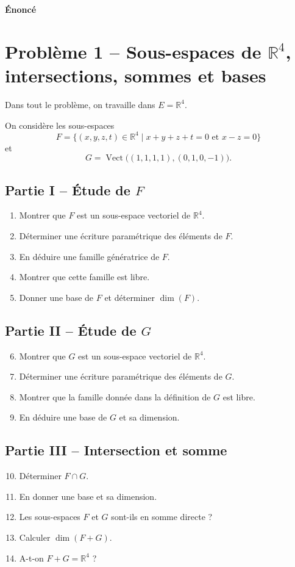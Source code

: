 \documentclass[11pt,a4paper]{article}
\newcommand{\R}{\mathbb{R}}
\newcommand{\Vect}{\operatorname{Vect}}
\newcommand{\dimv}{\operatorname{dim}}
\begin{document}
\vspace{0.6em}

\begin{center}
\textbf{Énoncé}
\end{center}

\section*{Problème 1 -- Sous-espaces de $\R^4$, intersections, sommes et bases}

Dans tout le problème, on travaille dans $E=\R^4$.

On considère les sous-espaces
\[
F=\{(x,y,z,t)\in\R^4\mid x+y+z+t=0\text{ et }x-z=0\}
\]
et
\[
G=\Vect\bigl((1,1,1,1),(0,1,0,-1)\bigr).
\]

\subsection*{Partie I -- Étude de $F$}
\begin{enumerate}[label=\arabic*.]
    \item Montrer que $F$ est un sous-espace vectoriel de $\R^4$.
    \item Déterminer une écriture paramétrique des éléments de $F$.
    \item En déduire une famille génératrice de $F$.
    \item Montrer que cette famille est libre.
    \item Donner une base de $F$ et déterminer $\dimv(F)$.
\end{enumerate}

\subsection*{Partie II -- Étude de $G$}
\begin{enumerate}[label=\arabic*.]
    \setcounter{enumi}{5}
    \item Montrer que $G$ est un sous-espace vectoriel de $\R^4$.
    \item Déterminer une écriture paramétrique des éléments de $G$.
    \item Montrer que la famille donnée dans la définition de $G$ est libre.
    \item En déduire une base de $G$ et sa dimension.
\end{enumerate}

\subsection*{Partie III -- Intersection et somme}
\begin{enumerate}[label=\arabic*.]
    \setcounter{enumi}{9}
    \item Déterminer $F\cap G$.
    \item En donner une base et sa dimension.
    \item Les sous-espaces $F$ et $G$ sont-ils en somme directe ?
    \item Calculer $\dimv(F+G)$.
    \item A-t-on $F+G=\R^4$ ?
\end{enumerate}
\end{document}
